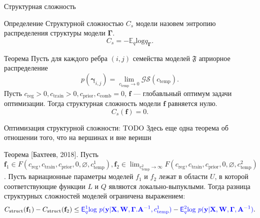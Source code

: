 \documentclass[usenames,dvipsnames,11pt,pdf,utf8,russian,aspectratio=43]{beamer}
\begin{document}
\begin{frame}{Структурная сложность}
\begin{block}{Определение}
Структурной сложностью $C_s$ модели назовем энтропию распределения структуры модели $\boldsymbol{\Gamma}$.
\[
    C_s = -\mathbb{E}_q \text{log} q_{\boldsymbol{\Gamma}}.
\]
\end{block}

\begin{block}{Теорема}
Пусть для каждого ребра $(i,j)$ семейства моделей $\mathfrak{F}$ априорное распределение $$p(\boldsymbol{\gamma}_{i,j}) =  \lim_{c_{\text{temp}} \to 0} \mathcal{GS}(c_{\text{temp}}).$$
Пусть $c_{\text{reg}} >0, c_{\text{train}} >0, c_{\text{prior}}, c_{\text{comb}}=0$, $\mathbf{f}$ --- глобавльный оптимум задачи оптимизации.
Тогда структурная сложность модели $\mathbf{f}$ равняется нулю.
\[
    C_s(\mathbf{f}) = 0.
\]
\end{block}

\end{frame}
\begin{frame}{Оптимизация структурной сложности: TODO}
\small
Здесь еще одна теорема об отношении того, что на вершинах и вне веришн

\begin{block}{Теорема [Бахтеев, 2018].}
Пусть $\mathbf{f}_1 \in F(c_{\text{reg}}, c_{\text{train}},  c_{\text{prior}}, 0, \varnothing,  c^1_{\text{temp}}), \mathbf{f}_2   \in \lim_{c^2_{\text{temp}} \to \infty} F(c_{\text{reg}}, c_{\text{train}},  c_{\text{prior}}, 0, \varnothing,  c^2_{\text{temp}})$.
Пусть вариационные параметры моделей $f_1$ и $f_2$ лежат в области $U$, в которой соответствующие функции $L$ и $Q$ являются локально-выпуклыми. 
Тогда разница структурных сложностей моделей ограничена выражением:
\[
    C_\text{struct}(\mathbf{f}_1)  - C_\text{struct}(\mathbf{f}_2) \leq \textcolor{blue}{\mathsf{E}_q^1 \text{log}~{p(\mathbf{y} | \mathbf{X}, \mathbf{W}, \boldsymbol{\Gamma}. \mathbf{A}^{-1}, c^1_{\text{temp}})}} - \textcolor{blue}{\mathsf{E}_q^2 \text{log}~{p(\mathbf{y} | \mathbf{X}, \mathbf{W}, \boldsymbol{\Gamma}, \mathbf{A}^{-1})}}.
\]
\end{block}

\end{frame}
\end{document}
